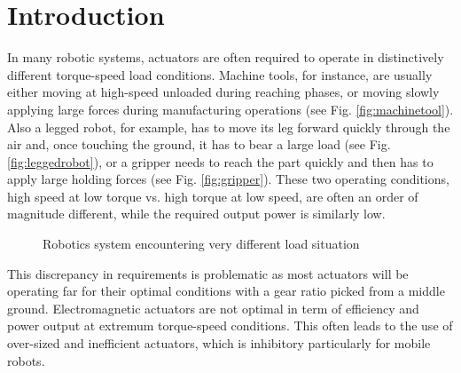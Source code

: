 \chapter{Introduction}
\label{sec:Introduction}




In many robotic systems, actuators are often required to operate in distinctively different torque-speed load conditions. Machine tools, for instance, are usually either moving at high-speed unloaded during reaching phases, or moving slowly applying large forces during manufacturing operations (see Fig. \ref{fig:machinetool}). Also a legged robot, for example, has to move its leg forward quickly through the air and, once touching the ground, it has to bear a large load (see Fig. \ref{fig:leggedrobot}), or a gripper needs to reach the part quickly and then has to apply large holding forces (see Fig. \ref{fig:gripper}). These two operating conditions, high speed at low torque vs. high torque at low speed, are often an order of magnitude different, while the required output power is similarly low.

%
\begin{figure}[H]
				\vspace{-10pt}
        \centering
        \caption{Robotics system encountering very different load situation}
				\label{fig:app}
\end{figure}

This discrepancy in requirements is problematic as most actuators will be operating far for their optimal conditions with a gear ratio picked from a middle ground. Electromagnetic actuators are not optimal in term of efficiency and power output at extremum torque-speed conditions. This often leads to the use of over-sized and inefficient actuators, which is inhibitory particularly for mobile robots.


